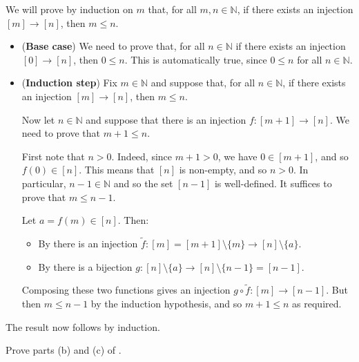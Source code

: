 \begin{cproof}[of (a)]
We will prove by induction on $m$ that, for all $m,n \in \mathbb{N}$, if there exists an injection $[m] \to [n]$, then $m \le n$.

\begin{itemize}
\item (\textbf{Base case}) We need to prove that, for all $n \in \mathbb{N}$ if there exists an injection $[0] \to [n]$, then $0 \le n$. This is automatically true, since $0 \le n$ for all $n \in \mathbb{N}$.
\item (\textbf{Induction step}) Fix $m \in \mathbb{N}$ and suppose that, for all $n \in \mathbb{N}$, if there exists an injection $[m] \to [n]$, then $m \le n$.

Now let $n \in \mathbb{N}$ and suppose that there is an injection $f : [m+1] \to [n]$. We need to prove that $m+1 \le n$.

First note that $n > 0$. Indeed, since $m+1 > 0$, we have $0 \in [m+1]$, and so $f(0) \in [n]$. This means that $[n]$ is non-empty, and so $n > 0$. In particular, $n-1 \in \mathbb{N}$ and so the set $[n-1]$ is well-defined. It suffices to prove that $m \le n-1$.

Let $a = f(m) \in [n]$. Then:
\begin{itemize}
\item By  there is an injection $\tilde{f} : [m] = [m+1] \setminus \{ m \} \to [n] \setminus \{ a \}$.
\item By  there is a bijection $g : [n] \setminus \{ a \} \to [n] \setminus \{ n-1 \} = [n-1]$.
\end{itemize}

Composing these two functions gives an injection $g \circ \tilde{f} : [m] \to [n-1]$. But then $m \le n-1$ by the induction hypothesis, and so $m+1 \le n$ as required.
\end{itemize}
The result now follows by induction.
\end{cproof}

\begin{exercise}
Prove parts (b) and (c) of .
\end{exercise}

